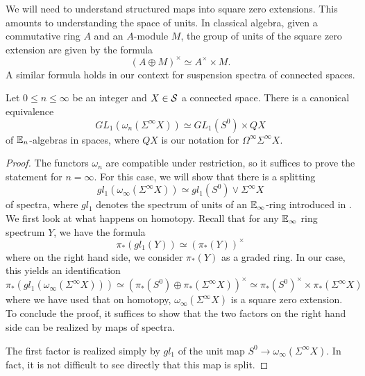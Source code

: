 We will need to understand structured maps into square zero extensions.  This amounts to understanding the space of units.  In classical algebra, given a commutative ring $A$ and an $A$-module $M$, the group of units of the square zero extension are given by the formula $$(A\oplus M)^{\times} \simeq A^{\times} \times M.$$ A similar formula holds in our context for suspension spectra of connected spaces.  

\begin{prop}\label{prop:sq0units}
Let $0\leq n\leq \infty$ be an integer and $X\in \operatorname{\mathcal{S}}$ a connected space.  
 There is a canonical equivalence $$GL_1(\omega_n (\Sigma^{\infty} X)) \simeq GL_1(S^0) \times QX$$ of $\operatorname{\mathbb{E}}_n$-algebras in spaces, where $QX$ is our notation for $\Omega^{\infty}\Sigma^\infty X$.  
\end{prop}
\begin{proof}
The functors $\omega_n$ are compatible under restriction, so it suffices to prove the statement for $n=\infty.$  For this case, we will show that there is a splitting $$gl_1(\omega_\infty(\Sigma^{\infty}X)) \simeq gl_1(S^0) \vee \Sigma^\infty X$$ of spectra, where $gl_1$ denotes the spectrum of units of an $\operatorname{\mathbb{E}}_\infty$-ring introduced in \cite{MQRT}.  We first look at what happens on homotopy.  Recall that for any $\operatorname{\mathbb{E}}_\infty$ ring spectrum $Y$, we have the formula $$\pi_*(gl_1(Y)) \simeq (\pi_*(Y))^\times$$ where on the right hand side, we consider $\pi_*(Y)$ as a graded ring.  In our case, this yields an identification $$\pi_*(gl_1(\omega_\infty (\Sigma^{\infty}X))) \simeq (\pi_*(S^0) \oplus \pi_*(\Sigma^{\infty}X))^\times \simeq \pi_*(S^0)^{\times} \times \pi_*(\Sigma^\infty X)$$
where we have used that on homotopy, $\omega_\infty (\Sigma^\infty X)$ is a square zero extension.  To conclude the proof, it suffices to show that the two factors on the right hand side can be realized by maps of spectra.  

The first factor is realized simply by $gl_1$ of the unit map $S^0 \to \omega_\infty (\Sigma^\infty X).$  In fact, it is not difficult to see directly that this map is split.  


\end{proof}
